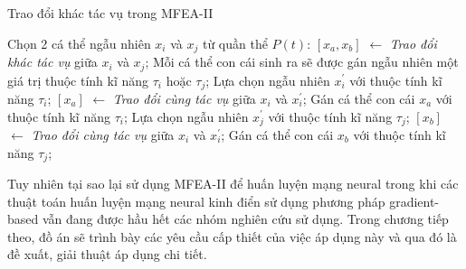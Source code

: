     \begin{algorithm}[h!]
        \caption{Trao đổi khác tác vụ trong MFEA-II}
        \begin{algorithmic}[1]
            \State Chọn 2 cá thể ngẫu nhiên $x_i$ và $x_j$ từ quần thể $P(t)$:
                    \State $[x_a, x_b]$ $\leftarrow$ \emph{Trao đổi khác tác vụ} giữa $x_i$ và $x_j$;
                    \State Mỗi cá thể con cái sinh ra sẽ được gán ngẫu nhiên một giá trị thuộc tính kĩ năng $\tau_i$  hoặc $\tau_j$;
                \Else 
                    \State Lựa chọn ngẫu nhiên $x_i^{'}$ với thuộc tính kĩ năng $\tau_i$;
                    \State $[x_a]$ $\leftarrow$ \emph{Trao đổi cùng tác vụ} giữa $x_i$ và $x_i^{'}$;
                    \State Gán cá thể con cái $x_a$ với thuộc tính kĩ năng $\tau_i$;
                    \State Lựa chọn ngẫu nhiên $x_j^{'}$ với thuộc tính kĩ năng $\tau_j$;
                    \State $[x_b]$ $\leftarrow$ \emph{Trao đổi cùng tác vụ} giữa $x_i$ và $x_i^{'}$;
                    \State Gán cá thể con cái $x_b$ với thuộc tính kĩ năng $\tau_j$;
                
        \end{algorithmic}
        \label{alg:inter-task crossover}
    \end{algorithm}
     Tuy nhiên tại sao lại sử dụng MFEA-II để huấn luyện mạng neural trong khi các thuật toán huấn luyện mạng neural kinh điển sử dụng phương pháp gradient-based vẫn đang được hầu hết các nhóm nghiên cứu sử dụng. Trong chương tiếp theo, đồ án sẽ trình bày các yêu cầu cấp thiết của việc áp dụng này và qua đó là đề xuất, giải thuật áp dụng chi tiết.
    